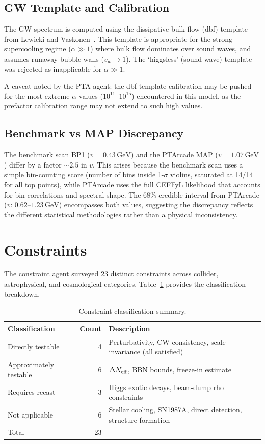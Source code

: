 \documentclass[a4paper,11pt]{article}
\newcommand{\GeV}{\,\text{GeV}}
\begin{document}
\subsection{GW Template and Calibration}

The GW spectrum is computed using the dissipative bulk flow (dbf) template from Lewicki and Vaskonen~\cite{lewicki2025dbf}. This template is appropriate for the strong-supercooling regime ($\alpha \gg 1$) where bulk flow dominates over sound waves, and assumes runaway bubble walls ($v_w \to 1$). The `higgsless' (sound-wave) template was rejected as inapplicable for $\alpha \gg 1$.

A caveat noted by the PTA agent: the dbf template calibration may be pushed for the most extreme $\alpha$ values ($10^{11}$--$10^{15}$) encountered in this model, as the prefactor calibration range may not extend to such high values.

\subsection{Benchmark vs MAP Discrepancy}

The benchmark scan BP1 ($v=0.43\GeV$) and the PTArcade MAP ($v=1.07\GeV$) differ by a factor $\sim 2.5$ in $v$. This arises because the benchmark scan uses a simple bin-counting score (number of bins inside 1-$\sigma$ violins, saturated at 14/14 for all top points), while PTArcade uses the full CEFFyL likelihood that accounts for bin correlations and spectral shape. The 68\% credible interval from PTArcade ($v$: $0.62$--$1.23\GeV$) encompasses both values, suggesting the discrepancy reflects the different statistical methodologies rather than a physical inconsistency.

\section{Constraints}

The constraint agent surveyed 23 distinct constraints across collider, astrophysical, and cosmological categories. Table~\ref{tab:constraints_summary} provides the classification breakdown.

\begin{table}[htbp]
\centering
\caption{Constraint classification summary.}
\label{tab:constraints_summary}
\begin{tabular}{lrl}
\toprule
Classification & Count & Description \\
\midrule
Directly testable & 4 & Perturbativity, CW consistency, scale invariance (all satisfied) \\
Approximately testable & 6 & $\Delta N_{\rm eff}$, BBN bounds, freeze-in estimate \\
Requires recast & 3 & Higgs exotic decays, beam-dump rho constraints \\
Not applicable & 6 & Stellar cooling, SN1987A, direct detection, structure formation \\
Total & 23 & -- \\
\bottomrule
\end{tabular}
\end{table}
\end{document}
